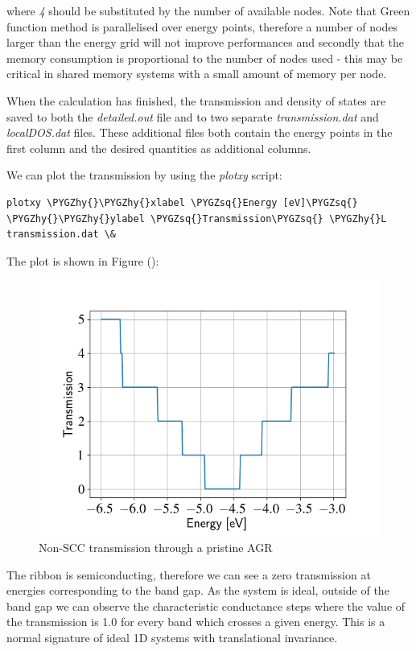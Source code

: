 \documentclass[a4paper,11pt,english]{sphinxmanual}
\def\PYGZhy{\char`\-}
\def\PYGZsq{\char`\'}
\renewcommand\PYGZsq{\textquotesingle}
\begin{document}
{{where \emph{4} should be substituted by the number of available nodes. Note
that Green function method is parallelised over energy points, therefore a number of
nodes larger than the energy grid will not improve performances and
secondly that the memory consumption is proportional to the number of
nodes used - this may be critical in shared memory systems with a
small amount of memory per node.

When the calculation has finished, the transmission and density of
states are saved to both the \emph{detailed.out} file and to two separate
\emph{transmission.dat} and \emph{localDOS.dat} files. These additional files both
contain the energy points in the first column and the desired
quantities as additional columns.

We can plot the transmission by using the \emph{plotxy} script:

\begin{Verbatim}[commandchars=\\\{\}]
plotxy \PYGZhy{}\PYGZhy{}xlabel \PYGZsq{}Energy [eV]\PYGZsq{} \PYGZhy{}\PYGZhy{}ylabel \PYGZsq{}Transmission\PYGZsq{} \PYGZhy{}L transmission.dat \&
\end{Verbatim}

The plot is shown in Figure {\hyperref[transport:fig-nonscc-tunn]{\emph{}}} ():
\begin{figure}[htbp]
\centering
\capstart
\includegraphics[width=0.700\linewidth]{nonscc-tunn.png}
\caption{Non-SCC transmission through a pristine AGR}\label{transport:fig-nonscc-tunn}\end{figure}

The ribbon is semiconducting, therefore we can see a zero transmission
at energies corresponding to the band gap. As the system is ideal,
outside of the band gap we can observe the characteristic conductance
steps where the value of the transmission is 1.0 for every band which
crosses a given energy. This is a normal signature of ideal 1D systems
with translational invariance.

}}
\end{document}
